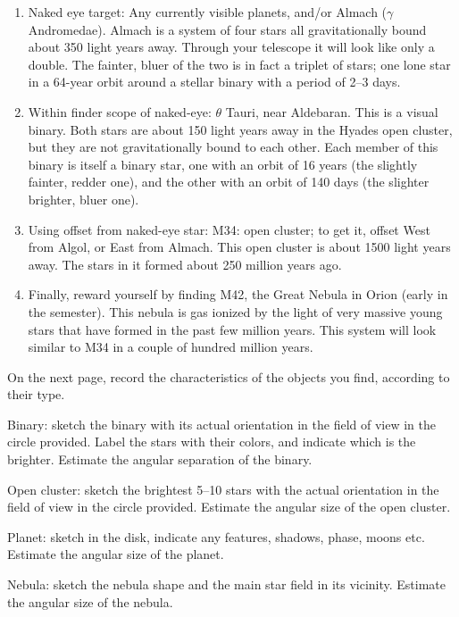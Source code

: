 \begin{enumerate}
\item Naked eye target: Any currently visible planets, and/or Almach
($\gamma$ Andromedae). Almach is a system of four stars all
gravitationally bound about 350 light years away. Through your
telescope it will look like only a double. The fainter, bluer of the
two is in fact a triplet of stars; one lone star in a 64-year orbit
around a stellar binary with a period of 2--3 days.
\item Within finder scope of naked-eye:
$\theta$ Tauri, near Aldebaran. This is a visual binary. Both stars
are about 150 light years away in the Hyades open cluster, but they
are not gravitationally bound to each other. Each member of this
binary is itself a binary star, one with an orbit of 16 years (the
slightly fainter, redder one), and the other with an orbit of 140 days
(the slighter brighter, bluer one).
\item Using offset from naked-eye star:
M34: open cluster; to get it, offset West from Algol, or East from
Almach. This open cluster is about 1500 light years away. The stars in
it formed about 250 million years ago.
\item Finally, reward yourself by finding M42, the Great Nebula in
  Orion (early in the semester). This nebula is gas ionized by the
  light of very massive young stars that have formed in the past few
  million years. This system will look similar to M34 in a couple of
  hundred million years.
\end{enumerate}

\medskip\noindent 
On the next page, record the characteristics of the
objects you find, according to their type.

\medskip\noindent 
Binary: sketch the binary with its actual orientation in the field of
view in the circle provided.  Label the stars with their colors, and
indicate which is the brighter. Estimate the angular separation of the binary.

\medskip\noindent 
Open cluster: sketch the brightest 5--10 stars with the actual
orientation in the field of view in the circle provided. Estimate the
angular size of the open cluster.

\medskip\noindent 
Planet:  sketch in the disk, indicate any features, shadows, phase,
moons etc. Estimate the angular size of the planet.

\medskip\noindent
Nebula: sketch the nebula shape and the main star field in its
vicinity. Estimate the angular size of the nebula.


